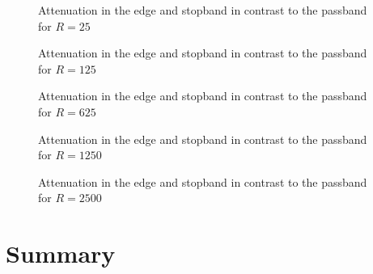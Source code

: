 \begin{figure}
    \centering
    
    \caption[Attenuation in the Edge and Stopband in Contrast to the Passband for R=25]{%
        Attenuation in the edge and stopband in contrast to the passband for $R=25$%
    }
    \label{fig:verification:fB25}
\end{figure}

\begin{figure}
    \centering
    
    \caption[Attenuation in the Edge and Stopband in Contrast to the Passband for R=125]{%
        Attenuation in the edge and stopband in contrast to the passband for $R=125$%
    }
    \label{fig:verification:fB125}
\end{figure}

\begin{figure}
    \centering
    
    \caption[Attenuation in the Edge and Stopband in Contrast to the Passband for R=625]{%
        Attenuation in the edge and stopband in contrast to the passband for $R=625$%
    }
    \label{fig:verification:fB625}
\end{figure}

\begin{figure}
    \centering
    
    \caption[Attenuation in the Edge and Stopband in Contrast to the Passband for R=1250]{%
        Attenuation in the edge and stopband in contrast to the passband for $R=1250$%
    }
    \label{fig:verification:fB1250}
\end{figure}

\begin{figure}
    \centering
    
    \caption[Attenuation in the Edge and Stopband in Contrast to the Passband for R=2500]{%
        Attenuation in the edge and stopband in contrast to the passband for $R=2500$%
    }
    \label{fig:verification:fB2500}
\end{figure}

%
%
\clearpage
\section{Summary} %
\label{sec:verification:summary}

